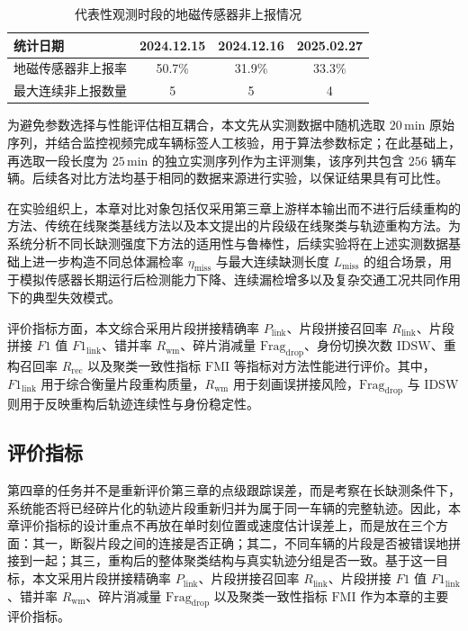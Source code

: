 \documentclass{xdupgthesis}
\begin{document}
\begin{table}[htbp]
	\centering
	\caption{代表性观测时段的地磁传感器非上报情况}
	\label{tab:ch4_reporting_status}
	\begin{tabular}{lccc}
		\toprule
		统计日期 & 2024.12.15 & 2024.12.16 & 2025.02.27 \\
		\midrule
		地磁传感器非上报率 & 50.7\% & 31.9\% & 33.3\% \\
		最大连续非上报数量 & 5 & 5 & 4 \\
		\bottomrule
	\end{tabular}
\end{table}

为避免参数选择与性能评估相互耦合，本文先从实测数据中随机选取 $20\,\mathrm{min}$ 原始序列，并结合监控视频完成车辆标签人工核验，用于算法参数标定；在此基础上，再选取一段长度为 $25\,\mathrm{min}$ 的独立实测序列作为主评测集，该序列共包含 $256$ 辆车辆。后续各对比方法均基于相同的数据来源进行实验，以保证结果具有可比性。

在实验组织上，本章对比对象包括仅采用第三章上游样本输出而不进行后续重构的方法、传统在线聚类基线方法以及本文提出的片段级在线聚类与轨迹重构方法。为系统分析不同长缺测强度下方法的适用性与鲁棒性，后续实验将在上述实测数据基础上进一步构造不同总体漏检率 $\eta_{\mathrm{miss}}$ 与最大连续缺测长度 $L_{\mathrm{miss}}$ 的组合场景，用于模拟传感器长期运行后检测能力下降、连续漏检增多以及复杂交通工况共同作用下的典型失效模式。

评价指标方面，本文综合采用片段拼接精确率 $P_{\mathrm{link}}$、片段拼接召回率 $R_{\mathrm{link}}$、片段拼接 $F1$ 值 $F1_{\mathrm{link}}$、错并率 $R_{\mathrm{wm}}$、碎片消减量 $\mathrm{Frag}_{\mathrm{drop}}$、身份切换次数 $\mathrm{IDSW}$、重构召回率 $R_{\mathrm{rec}}$ 以及聚类一致性指标 $\mathrm{FMI}$ 等指标对方法性能进行评价。其中，$F1_{\mathrm{link}}$ 用于综合衡量片段重构质量，$R_{\mathrm{wm}}$ 用于刻画误拼接风险，$\mathrm{Frag}_{\mathrm{drop}}$ 与 $\mathrm{IDSW}$ 则用于反映重构后轨迹连续性与身份稳定性。

\subsection{评价指标}

第四章的任务并不是重新评价第三章的点级跟踪误差，而是考察在长缺测条件下，系统能否将已经碎片化的轨迹片段重新归并为属于同一车辆的完整轨迹。因此，本章评价指标的设计重点不再放在单时刻位置或速度估计误差上，而是放在三个方面：其一，断裂片段之间的连接是否正确；其二，不同车辆的片段是否被错误地拼接到一起；其三，重构后的整体聚类结构与真实轨迹分组是否一致。基于这一目标，本文采用片段拼接精确率 $P_{\mathrm{link}}$、片段拼接召回率 $R_{\mathrm{link}}$、片段拼接 $F1$ 值 $F1_{\mathrm{link}}$、错并率 $R_{\mathrm{wm}}$、碎片消减量 $\mathrm{Frag}_{\mathrm{drop}}$ 以及聚类一致性指标 $\mathrm{FMI}$ 作为本章的主要评价指标。
\end{document}

